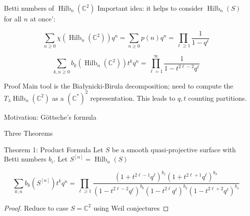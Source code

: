 \documentclass{beamer}
\DeclareMathOperator{\Hilb}{Hilb}
\newcommand{\C}{\mathbb{C}}
\begin{document}
\begin{frame}{Betti numbers of $\Hilb_n(\C^2)$}
Important idea: it helps to consider $\Hilb_n(S)$ for all $n$ at once':

\begin{Theorem}[Warm-up]
$$\sum_{n\geq 0} \chi(\Hilb_n(\C^2))q^n=\sum_{n\geq0} p(n)q^n=\prod_{\ell\geq 1} \frac{1}{1-q^\ell}$$
\end{Theorem}


\begin{theorem}
$$\sum_{k,n \geq 0} b_k(\Hilb_n(\C^2))t^k q^n=\prod_{\ell=1}^\infty \frac{1}{1-t^{2\ell-2}q^\ell}$$
\end{theorem}
\begin{block}{Proof}
 Main tool is the \alert{Bia\l ynicki-Birula decomposition}; need to
 compute the $T_\lambda\Hilb_n(\C^2)$ as a $(\C^*)^2$ representation.  This leads to $q,t$ counting partitions.


 \end{block}

\end{frame}

\begin{frame}[plain,c]

\begin{center}

\Huge

Motivation: G\"ottsche's formula
\end{center}
\begin{center}
\Huge
Three Theorems
\end{center}

\end{frame}



\begin{frame}{Theorem 1: Product Formula}
Let $S$ be a smooth quasi-projective surface with Betti numbers $b_i$.  Let $S^{[n]}=\Hilb_n(S)$

\begin{Theorem}[G\"ottsche, 1990]
$$\sum_{k,n} b_k(S^{[n]})t^k q^n=\prod_{\ell\geq 1} \frac{(1+t^{2\ell-1}q^\ell)^{b_1}(1+t^{2\ell+1}q^\ell)^{b_3}}{(1-t^{2\ell-2}q^\ell)^{b_0}(1-t^{2\ell}q^\ell)^{b_2}(1-t^{2\ell+2}q^\ell)^{b_4}}$$
\end{Theorem}

\begin{proof} 
 Reduce to case $S=\C^2$ using Weil conjectures
\end{proof}

\end{frame}
\end{document}
